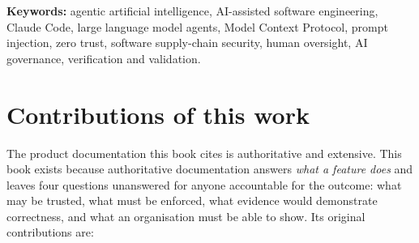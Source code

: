 \documentclass[11pt,a4paper,twoside,openany]{book}
\begin{document}
\textbf{Keywords:} agentic artificial intelligence, AI-assisted software engineering, Claude Code, large language model agents, Model Context Protocol, prompt injection, zero trust, software supply-chain security, human oversight, AI governance, verification and validation.


\FloatBarrier
\section*{Contributions of this work}

The product documentation this book cites is authoritative and extensive. This book exists because authoritative documentation answers \emph{what a feature does} and leaves four questions unanswered for anyone accountable for the outcome: what may be trusted, what must be enforced, what evidence would demonstrate correctness, and what an organisation must be able to show. Its original contributions are:
\end{document}
